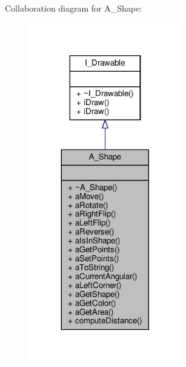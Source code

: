 Collaboration diagram for A\+\_\+\+Shape\+:
\nopagebreak
\begin{figure}[H]
\begin{center}
\leavevmode
\includegraphics[width=188pt]{classA__Shape__coll__graph}
\end{center}
\end{figure}
